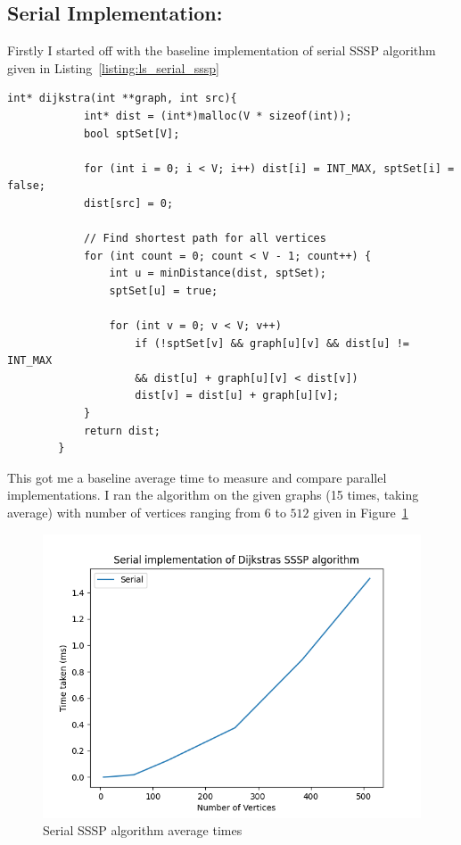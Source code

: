 	\subsection{Serial Implementation:}
	Firstly I started off with the baseline implementation of serial SSSP algorithm given in Listing~\ref{listing:ls_serial_sssp}
	\begin{lstlisting}[caption={Sequential algorithm for Dijkstra’s SSSP\cite{SSSP}.}, label={listing:ls_serial_sssp}]
		int* dijkstra(int **graph, int src){
			int* dist = (int*)malloc(V * sizeof(int));
			bool sptSet[V]; 

			for (int i = 0; i < V; i++) dist[i] = INT_MAX, sptSet[i] = false;
			dist[src] = 0;
			
			// Find shortest path for all vertices
			for (int count = 0; count < V - 1; count++) {
				int u = minDistance(dist, sptSet);
				sptSet[u] = true;

				for (int v = 0; v < V; v++)
					if (!sptSet[v] && graph[u][v] && dist[u] != INT_MAX
					&& dist[u] + graph[u][v] < dist[v])
					dist[v] = dist[u] + graph[u][v];
			}
			return dist;
		}
	\end{lstlisting}
	
	This got me a baseline average time to measure and compare parallel implementations. I ran the algorithm on the given graphs (15 times, taking average) with number of vertices ranging from $6$ to $512$ given in Figure~\ref{fig:fig_serial_sssp}
	\begin{figure}[!htb]
		\centering
		\includegraphics[width=0.6\linewidth]{serial_sssp.png}
		\caption{Serial SSSP algorithm average times}
		\label{fig:fig_serial_sssp}
	\end{figure}
	
